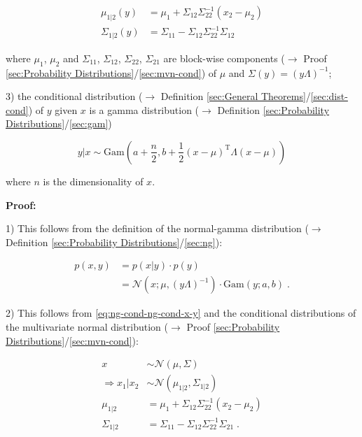 \documentclass[a4paper,12pt,twoside]{book}
\begin{document}
\begin{equation} \label{eq:ng-cond-ng-cond-x1-x2-y-hyp}
\begin{split}
\mu_{1|2}(y) &= \mu_1 + \Sigma_{12} \Sigma_{22}^{-1} (x_2 - \mu_2) \\
\Sigma_{1|2}(y) &= \Sigma_{11} - \Sigma_{12} \Sigma_{22}^{-1} \Sigma_{12}
\end{split}
\end{equation}

where $\mu_1$, $\mu_2$ and $\Sigma_{11}$, $\Sigma_{12}$, $\Sigma_{22}$, $\Sigma_{21}$ are block-wise components ($\rightarrow$ Proof \ref{sec:Probability Distributions}/\ref{sec:mvn-cond}) of $\mu$ and $\Sigma(y) = (y \Lambda)^{-1}$;

3) the conditional distribution ($\rightarrow$ Definition \ref{sec:General Theorems}/\ref{sec:dist-cond}) of $y$ given $x$ is a gamma distribution ($\rightarrow$ Definition \ref{sec:Probability Distributions}/\ref{sec:gam})

\begin{equation} \label{eq:ng-cond-ng-cond-y-x}
y|x \sim \mathrm{Gam}\left( a + \frac{n}{2}, b + \frac{1}{2} (x-\mu)^\mathrm{T} \Lambda (x-\mu) \right)
\end{equation}

where $n$ is the dimensionality of $x$.


\vspace{1em}
\textbf{Proof:}

1) This follows from the definition of the normal-gamma distribution ($\rightarrow$ Definition \ref{sec:Probability Distributions}/\ref{sec:ng}):

\begin{equation} \label{eq:ng-cond-ng-pdf}
\begin{split}
p(x,y) &= p(x|y) \cdot p(y) \\
&= \mathcal{N}(x; \mu, (y \Lambda)^{-1}) \cdot \mathrm{Gam}(y; a, b) \; .
\end{split}
\end{equation}

2) This follows from \eqref{eq:ng-cond-ng-cond-x-y} and the conditional distributions of the multivariate normal distribution ($\rightarrow$ Proof \ref{sec:Probability Distributions}/\ref{sec:mvn-cond}):

\begin{equation} \label{eq:ng-cond-mvn-cond}
\begin{split}
x &\sim \mathcal{N}(\mu, \Sigma) \\
\Rightarrow x_1|x_2 &\sim \mathcal{N}(\mu_{1|2}, \Sigma_{1|2}) \\
\mu_{1|2} &= \mu_1 + \Sigma_{12} \Sigma_{22}^{-1} (x_2 - \mu_2) \\
\Sigma_{1|2} &= \Sigma_{11} - \Sigma_{12} \Sigma_{22}^{-1} \Sigma_{21} \; .
\end{split}
\end{equation}
\end{document}
